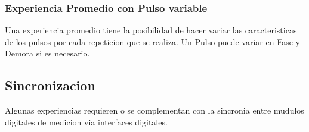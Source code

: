 \subsubsection{Experiencia Promedio con Pulso variable}
Una experiencia promedio tiene la posibilidad
de hacer variar las caracteristicas de los pulsos
por cada repeticion que se realiza.
Un Pulso puede variar en Fase y Demora si es necesario.


\subsection{Sincronizacion}
Algunas experiencias requieren o se complementan con la sincronia entre mudulos digitales de medicion via interfaces 
digitales.

\newpage